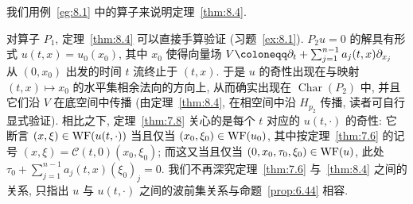 我们用例~\ref{eg:8.1} 中的算子来说明定理~\ref{thm:8.4}.

\begin{example}\label{eg:8.5}
对算子 $P_1$, 定理~\ref{thm:8.4} 可以直接手算验证 (习题~\ref{ex:8.1}). $P_2 u = 0$ 的解具有形式 $u(t, x) = u_0(x_0)$, 其中 $x_0$ 使得向量场 $V \defeq \partial_t + \sum_{j=1}^{n-1} a_j(t, x)\partial_{x_j}$ 从 $(0, x_0)$ 出发的时间 $t$ 流终止于 $(t, x)$. 于是 $u$ 的奇性出现在与映射 $(t, x) \mapsto x_0$ 的水平集相余法向的方向上, 从而确实出现在 $\operatorname{Char}(P_2)$ 中, 并且它们沿 $V$ 在底空间中传播 (由定理~\ref{thm:8.4}, 在相空间中沿 $H_{p_2}$ 传播, 读者可自行显式验证). 相比之下, 定理~\ref{thm:7.8} 关心的是每个 $t$ 对应的 $u(t, \cdot)$ 的奇性: 它断言 $(x, \xi) \in \operatorname{WF}(u(t, \cdot))$ 当且仅当 $(x_0, \xi_0) \in \operatorname{WF}(u_0)$, 其中按定理~\ref{thm:7.6} 的记号 $(x, \xi) = \mathcal{C}(t, 0)(x_0, \xi_0)$; 而这又当且仅当 $(0, x_0, \tau_0, \xi_0) \in \operatorname{WF}(u)$, 此处 $\tau_0 + \sum_{j=1}^{n-1} a_j(t, x)(\xi_0)_j = 0$. 我们不再深究定理~\ref{thm:7.6} 与~\ref{thm:8.4} 之间的关系, 只指出 $u$ 与 $u(t, \cdot)$ 之间的波前集关系与命题~\ref{prop:6.44} 相容.
\end{example}

